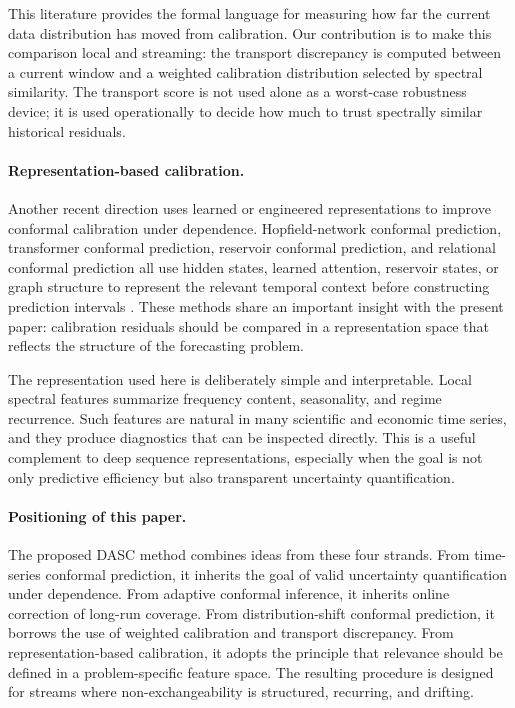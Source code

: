 \documentclass[11pt]{article}
\begin{document}
This literature provides the formal language for measuring how far the current data distribution has moved from calibration. Our contribution is to make this comparison local and streaming: the transport discrepancy is computed between a current window and a weighted calibration distribution selected by spectral similarity. The transport score is not used alone as a worst-case robustness device; it is used operationally to decide how much to trust spectrally similar historical residuals.

\paragraph{Representation-based calibration.}
Another recent direction uses learned or engineered representations to improve conformal calibration under dependence. Hopfield-network conformal prediction, transformer conformal prediction, reservoir conformal prediction, and relational conformal prediction all use hidden states, learned attention, reservoir states, or graph structure to represent the relevant temporal context before constructing prediction intervals \citep{auer2023hopfield,lee2024transformer,negli2025reservoir,cini2025relational}. These methods share an important insight with the present paper: calibration residuals should be compared in a representation space that reflects the structure of the forecasting problem.

The representation used here is deliberately simple and interpretable. Local spectral features summarize frequency content, seasonality, and regime recurrence. Such features are natural in many scientific and economic time series, and they produce diagnostics that can be inspected directly. This is a useful complement to deep sequence representations, especially when the goal is not only predictive efficiency but also transparent uncertainty quantification.

\paragraph{Positioning of this paper.}
The proposed DASC method combines ideas from these four strands. From time-series conformal prediction, it inherits the goal of valid uncertainty quantification under dependence. From adaptive conformal inference, it inherits online correction of long-run coverage. From distribution-shift conformal prediction, it borrows the use of weighted calibration and transport discrepancy. From representation-based calibration, it adopts the principle that relevance should be defined in a problem-specific feature space. The resulting procedure is designed for streams where non-exchangeability is structured, recurring, and drifting.
\end{document}

